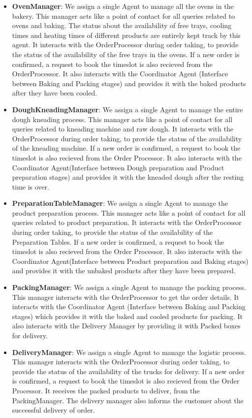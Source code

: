 \documentclass[12pt]{article}
\begin{document}
\begin{itemize}
    \item \textbf{OvenManager}: We assign a single Agent to manage all the ovens in the bakery. This manager acts like a point of contact for all queries related to ovens and baking. The status about the availability of free trays, cooling times and heating times of different products are entirely kept track by this agent. It interacts with the OrderProcessor during order taking, to provide the status of the availability of the free trays in the ovens. If a new order is confirmed, a request to book the timeslot is also recieved from the OrderProcessor. It also interacts with the Coordinator Agent (Interface between Baking and Packing stages) and provides it with the baked products after they have been cooled.
    \item \textbf{DoughKneadingManager}: We assign a single Agent to manage the entire dough kneading process. This manager acts like a point of contact for all queries related to kneading machine and raw dough. It interacts with the OrderProcessor during order taking, to provide the status of the availability of the kneading machine. If a new order is confirmed, a request to book the timeslot is also recieved from the Order Processor. It also interacts with the Coordinator Agent(Interface between Dough preparation and Product preparation stages) and provides it with the kneaded dough after the resting time is over.
    \item \textbf{PreparationTableManager}: We assign a single Agent to manage the product preparation process. This manager acts like a point of contact for all queries related to product preparation. It interacts with the OrderProcessor during order taking, to provide the status of the availability of the Preparation Tables. If a new order is confirmed, a request to book the timeslot is also recieved from the Order Processor. It also interacts with the Coordinator Agent(Interface between Product preparation and Baking stages) and provides it with the unbaked products after they have been prepared.
    \item \textbf{PackingManager}: We assign a single Agent to manage the packing process. This manager interacts with the OrderProcessor to get the order details. It interacts with the Coordinator Agent (Interface between Baking and Packing stages) which provides it with the baked and cooled products for packing. It also interacts with the Delivery Manager by providing it with Packed boxes for delivery.
    \item \textbf{DeliveryManager}: We assign a single Agent to manage the logistic process. This manager interacts with the OrderProcessor during order taking, to provide the status of the availability of the trucks for delivery. If a new order is confirmed, a request to book the timeslot is also recieved from the Order Processor. It receives the packed products to deliver, from the PackingManager. The delivery manager also informs the customer about the successful delivery of order.

\end{itemize}
\end{document}
